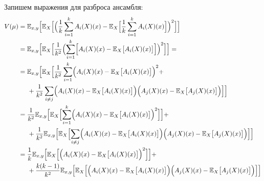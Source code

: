 \documentclass{article}
\begin{document}
Запишем выражения для разброса ансамбля:
\begin{align*}
  V(\mu) &= \mathbb{E}_{x, y} \Bigl[
    \mathbb{E}_{X} \Bigl[
      \Bigl(
        \frac{1}{k}
        \sum_{i = 1}^{k}
        A_i(X)(x)
        -
        \mathbb{E}_{X} \Bigl[
          \frac{1}{k}
          \sum_{i = 1}^{k}
          A_i(X)(x)
          \Bigr]
          \Bigr)^2
          \Bigr]
          \Bigr] \\
    &= \mathbb{E}_{x, y} \Bigl[
    \mathbb{E}_{X} \Bigl[
    \frac{1}{k^2}
    \Bigl(
        \sum_{i = 1}^{k} \Bigl[
                A_i(X)(x)
                -
                \mathbb{E}_{X} \bigl[
                    A_i(X)(x)
                \bigr]
        \Bigr]
    \Bigr)^2\Bigr]
          \Bigr]
    =\\
    &= \mathbb{E}_{x, y} \Bigl[
    \mathbb{E}_{X} \Bigl[
    \frac{1}{k^2}
    \sum_{i = 1}^{k} \Bigl(
        A_i(X)(x)
        -
        \mathbb{E}_{X} \bigl[
            A_i(X)(x)
        \bigr]
    \Bigr)^2 +\\
    &\text{\hspace{0.5cm}}+
    \frac{1}{k^2}
    \sum_{i \neq j} \Bigl(
        A_i(X)(x)
        -
        \mathbb{E}_{X} \bigl[
            A_i(X)(x)
        \bigr]
    \Bigr)
    \Bigl(
        A_j(X)(x)
        -
        \mathbb{E}_{X} \bigl[
            A_j(X)(x)
        \bigr]
    \Bigr)\Bigr]
          \Bigr] \\
    &=
    \frac{1}{k^2}
    \mathbb{E}_{x, y} \Bigl[
        \mathbb{E}_{X} \Bigl[
            \sum_{i = 1}^{k} \Bigl(
                A_i(X)(x)
                -
                \mathbb{E}_{X} \bigl[
                    A_i(X)(x)
                \bigr]
            \Bigr)^2
        \Bigr]
    \Bigr]
    +\\
    &\text{\hspace{0.5cm}}+
    \frac{1}{k^2}
    \mathbb{E}_{x, y} \Bigl[
        \mathbb{E}_{X} \Bigl[
            \sum_{i \neq j} \Bigl(
                A_i(X)(x)
                -
                \mathbb{E}_{X} \bigl[
                    A_i(X)(x)
                \bigr]
            \Bigr) 
            \Bigl(
                A_j(X)(x)
                -
                \mathbb{E}_{X} \bigl[
                    A_j(X)(x)
                \bigr]
            \Bigr)
        \Bigr]
    \Bigr]
    \\
    &=
    \frac{1}{k}
    \mathbb{E}_{x, y} \Bigl[
        \mathbb{E}_{X} \Bigl[
            \Bigl(
                A_i(X)(x)
                -
                \mathbb{E}_{X} \bigl[
                    A_i(X)(x)
                \bigr]
            \Bigr)^2
        \Bigr]
    \Bigr]
    +\\
    &\text{\hspace{0.5cm}}+
    \frac{k(k-1)}{k^2}
    \mathbb{E}_{x, y} \Bigl[
        \mathbb{E}_{X} \Bigl[
            \Bigl(
                A_i(X)(x)
                -
                \mathbb{E}_{X} \bigl[
                    A_i(X)(x)
                \bigr]
            \Bigr)
            \Bigl(   
                A_j(X)(x)
                -
                \mathbb{E}_{X} \bigl[
                    A_j(X)(x)
                \bigr]
            \Bigr)
        \Bigr]
    \Bigr]
\end{align*}
\end{document}

